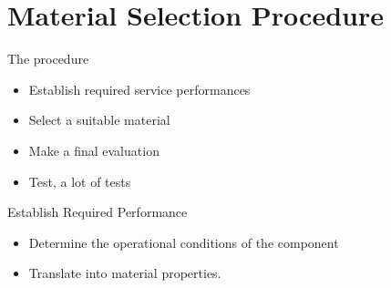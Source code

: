 \documentclass[10pt, svgnames]{beamer}
\begin{document}
\section{Material Selection Procedure}
\label{sec:org66f69b0}

\begin{frame}[label={sec:org0df80a8}]{The procedure}
\begin{itemize}
\item Establish required service performances
\item Select a suitable material
\item Make a final evaluation
\item Test, a lot of tests
\end{itemize}
\end{frame}



\begin{frame}[label={sec:org8251655}]{Establish Required Performance}
\begin{itemize}
\item Determine the operational conditions of the component
\item Translate into material properties.
\end{itemize}

\vspace{1cm}
\centering
{}
\end{frame}
\end{document}
